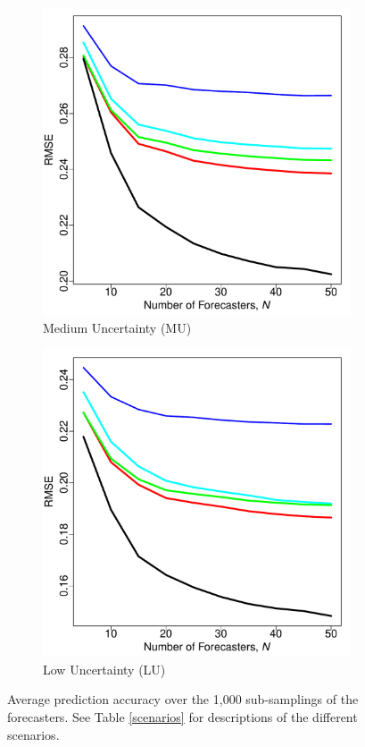 \documentclass[11pt]{article}
\theoremstyle{definition}
\theoremstyle{definition}
\begin{document}
\begin{figure}[t!]
\begin{subfigure}{0.32\textwidth}
                \includegraphics[width=\textwidth]{realMU}
                \caption{Medium Uncertainty (MU)}
                                \label{medUnc}
        \end{subfigure}
        \begin{subfigure}{0.32\textwidth}
                \includegraphics[width=\textwidth]{realLU}
                \caption{Low Uncertainty (LU)}
                                \label{lowUnc}
        \end{subfigure}             
        
        \caption{Average prediction accuracy over the 1,000 sub-samplings of the forecasters. See Table \ref{scenarios} for descriptions of the different scenarios.}
        \label{simReal}
\end{figure}
\end{document}
